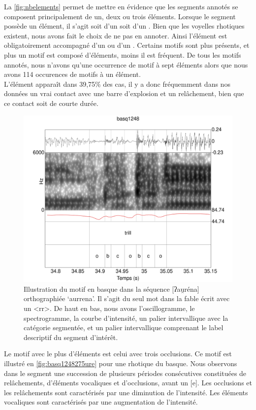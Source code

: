 La \autoref{fig:nbelements} permet de mettre en évidence que les segments annotés se composent principalement de un, deux ou trois éléments. Lorsque le segment possède un élément, il s'agit soit d'un  soit d'un . Bien que les voyelles rhotiques existent, nous avons fait le choix de ne pas en annoter. Ainsi l'élément  est obligatoirement accompagné d'un  ou d'un .
Certains motifs sont plus présents, et plus un motif est composé d'éléments, moins il est fréquent. De tous les motifs annotés, nous n'avons qu'une occurrence de motif à sept éléments alors que nous avons 114 occurences de motifs à un élément.\\

L'élément  apparaît dans 39,75\% des cas, il y a donc fréquemment dans nos données un vrai contact avec une barre d'explosion et un relâchement, bien que ce contact soit de courte durée.\\

\begin{figure}
	\centering
	\includegraphics[width=0.7\linewidth]{substance/spectro_images/basq1248_275_ure}
	\caption[Illustration du motif ]{Illustration du motif  en basque  dans la séquence [ʔau̯réna] orthographiée ‘aurrena’. Il s'agit du seul mot dans la fable écrit avec un <rr>. De haut en bas, nous avons l'oscillogramme, le spectrogramme, la courbe d'intensité, un palier intervallique avec la catégorie segmentée, et un palier intervallique comprenant le label descriptif du segment d'intérêt.}
	\label{fig:basq1248275ure}
\end{figure}


Le motif avec le plus d'éléments est celui  avec trois occlusions. Ce motif est illustré en \autoref{fig:basq1248275ure} pour une rhotique du basque. Nous observons dans le segment une succession de plusieurs périodes consécutives constituées de relâchements, d'éléments vocaliques et d'occlusions, avant un [e]. Les occlusions et les relâchements sont caractérisés par une diminution de l'intensité. Les éléments vocaliques sont caractérisés par une augmentation de l'intensité.\\

